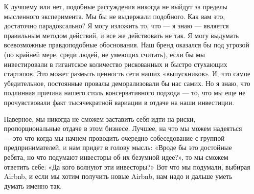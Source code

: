 \documentclass[ebook,12pt,oneside,openany]{memoir}
\begin{document}
К лучшему или нет, подобные рассуждения никогда не выйдут за пределы
мысленного эксперимента. Мы бы не выдержали подобного. Как вам это,
достаточно парадоксально? Я могу изложить то, что — я знаю — является
правильным методом действий, и все же действовать не так. Я могу
выдумать всевозможные правдоподобные обоснования. Наш бренд оказался
бы под угрозой (по крайней мере, среди людей, не умеющих считать),
если бы мы инвестировали в гигантское количество рискованных и быстро
стухающих стартапов. Это может размыть ценность сети наших
«выпускников». И, что самое убедительное, постоянные провалы
деморализовали бы нас самих. Но я знаю, что подлинная причина нашего
столь консервативного подхода — то, что мы еще не прочувствовали факт
тысячекратной вариации в отдаче на наши инвестиции.

Наверное, мы никогда не сможем заставить себя идти на риски,
пропорциональные отдаче в этом бизнесе. Лучшее, на что мы можем
надеяться — это что когда мы начнем проводить очередно собеседование с
группой предпринимателей, и нам придет в голову мысль: «Вроде бы это
достойные ребята, но что подумают инвесторы об их безумной идее?», то
мы сможем ответить себе: «Да кого волнуют эти инвесторы?» Вот что мы
подумали, выбирая Airbnb, и если мы хотим получить новые Airbnb, нам
надо и дальше уметь думать именно так.
\end{document}
